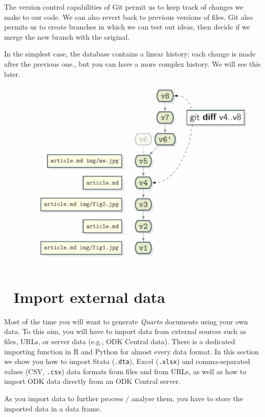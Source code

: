 \documentclass[
  letterpaper,
  DIV=11,
  numbers=noendperiod]{scrreprt}
\begin{document}
The version control capabilities of Git permit us to keep track of
changes we make to our code. We can also revert back to previous
versions of files. Git also permits us to create branches in which we
can test out ideas, then decide if we merge the new branch with the
original.

In the simplest case, the database contains a linear history: each
change is made after the previous one., but you can have a more complex
history. We will see this later.

\includegraphics{./images/paste-48384992.png}

\hypertarget{import-external-data}{%
\chapter{\texorpdfstring{{📘} Import external
data}{📘 Import external data}}\label{import-external-data}}

Most of the time you will want to generate \emph{Quarto} documents using
your own data. To this aim, you will have to import data from external
sources such as files, URLs, or server data (e.g., ODK Central data).
There is a dedicated importing function in R and Python for almost every
data format. In this section we show you how to import Stata
(\texttt{.dta}), Excel (\texttt{.xlsx}) and comma-separated values (CSV,
\texttt{.csv}) data formats from files and from URLs, as well as how to
import ODK data directly from an ODK Central server.

\begin{tcolorbox}[enhanced jigsaw, colframe=quarto-callout-important-color-frame, colback=white, rightrule=.15mm, bottomrule=.15mm, left=2mm, arc=.35mm, coltitle=black, title=\textcolor{quarto-callout-important-color}{\faExclamation}\hspace{0.5em}{Important}, opacitybacktitle=0.6, bottomtitle=1mm, opacityback=0, toptitle=1mm, toprule=.15mm, colbacktitle=quarto-callout-important-color!10!white, titlerule=0mm, leftrule=.75mm, breakable]
As you import data to further process / analyse them, you have to store
the imported data in a data frame.
\end{tcolorbox}
\end{document}
